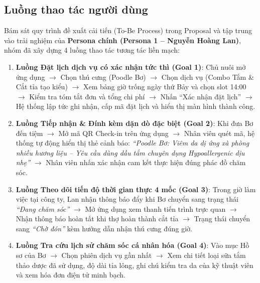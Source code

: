\subsection{Luồng thao tác người dùng}
Bám sát quy trình đề xuất cải tiến (To-Be Process) trong Proposal và tập trung vào trải nghiệm của \textbf{Persona chính (Persona 1 -- Nguyễn Hoàng Lan)}, nhóm đã xây dựng 4 luồng thao tác tương tác liền mạch:
\begin{enumerate}
    \item \textbf{Luồng Đặt lịch dịch vụ có xác nhận tức thì (Goal 1)}:
    Chủ nuôi mở ứng dụng $\rightarrow$ Chọn thú cưng (Poodle Bơ) $\rightarrow$ Chọn dịch vụ (Combo Tắm \& Cắt tỉa tạo kiểu) $\rightarrow$ Xem bảng giờ trống ngày thứ Bảy và chọn slot 14:00 $\rightarrow$ Kiểm tra tóm tắt đơn và tổng chi phí $\rightarrow$ Nhấn ``Xác nhận đặt lịch'' $\rightarrow$ Hệ thống lập tức ghi nhận, cấp mã đặt lịch và hiển thị màn hình thành công.
    \item \textbf{Luồng Tiếp nhận \& Đính kèm dặn dò đặc biệt (Goal 2)}:
    Khi đưa Bơ đến tiệm $\rightarrow$ Mở mã QR Check-in trên ứng dụng $\rightarrow$ Nhân viên quét mã, hệ thống tự động hiển thị thẻ cảnh báo: \textit{``Poodle Bơ: Viêm da dị ứng xà phòng nhiều hương liệu -- Yêu cầu dùng dầu tắm chuyên dụng Hypoallergenic dịu nhẹ''} $\rightarrow$ Nhân viên nhấn xác nhận cam kết thực hiện đúng phác đồ chăm sóc.
    \item \textbf{Luồng Theo dõi tiến độ thời gian thực 4 mốc (Goal 3)}:
    Trong giờ làm việc tại công ty, Lan nhận thông báo đẩy khi Bơ chuyển sang trạng thái \textit{``Đang chăm sóc''} $\rightarrow$ Mở ứng dụng xem thanh tiến trình trực quan $\rightarrow$ Nhận thông báo hoàn tất khi thợ hoàn thành cắt tỉa $\rightarrow$ Trạng thái chuyển sang \textit{``Chờ đón''} kèm hướng dẫn nhận thú cưng đúng giờ.
    \item \textbf{Luồng Tra cứu lịch sử chăm sóc cá nhân hóa (Goal 4)}:
    Vào mục Hồ sơ của Bơ $\rightarrow$ Chọn phiên dịch vụ gần nhất $\rightarrow$ Xem chi tiết loại sữa tắm thảo dược đã sử dụng, độ dài tỉa lông, ghi chú kiểm tra da của kỹ thuật viên và xem hóa đơn điện tử minh bạch.
\end{enumerate}

